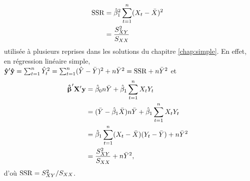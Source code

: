 \begin{solution}{3.4}
\begin{enumerate}
\begin{align*}
         \mathrm{SSR}
         &= \hat{\beta}_1^2 \sum_{t = 1}^n (X_t - \bar{X})^2 \\
         &= \frac{S_{XY}^2}{S_{XX}}
       \end{align*}
       utilisée à plusieurs reprises dans les solutions du chapitre
       \ref{chap:simple}.  En effet, en régression linéaire simple,
       $\mathbf{\hat{y}}^\prime \mathbf{\hat{y}} = \sum_{t = 1}^n
       \hat{Y}_t^2 = \sum_{t = 1}^n (\hat{Y} - \bar{Y})^2 + n
       \bar{Y}^2 = \mathrm{SSR} + n \bar{Y}^2$ et
       \begin{align*}
         \boldsymbol{\hat{\upbeta}}^\prime \mathbf{X}^\prime \mathbf{y}
         &= \hat{\beta}_0 n \bar{Y} + \hat{\beta}_1 \sum_{t = 1}^n X_t Y_t \\
         &= (\bar{Y} - \hat{\beta}_1 \bar{X}) n \bar{Y} +
         \hat{\beta}_1 \sum_{t = 1}^n X_t Y_t \\
         &= \hat{\beta}_1 \sum_{t = 1}^n (X_t - \bar{X})(Y_t -
         \bar{Y}) + n \bar{Y}^2 \\
         &= \frac{S_{XY}^2}{S_{XX}} + n \bar{Y}^2,
       \end{align*}
       d'où $\mathrm{SSR} = S_{XY}^2/S_{XX}$.
     \end{enumerate}
   
\end{solution}
